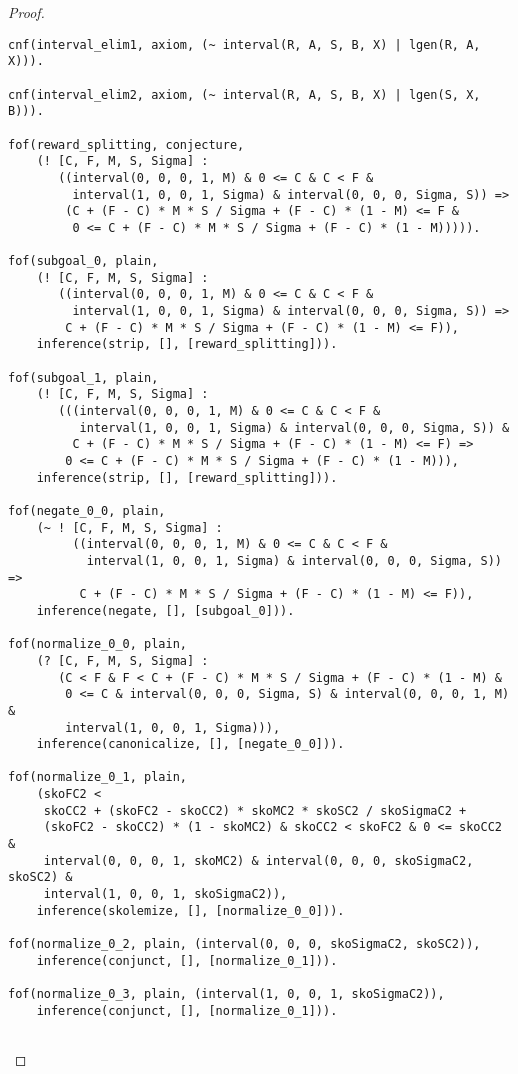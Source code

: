 \begin{proof}
\begin{verbatim}
cnf(interval_elim1, axiom, (~ interval(R, A, S, B, X) | lgen(R, A, X))).

cnf(interval_elim2, axiom, (~ interval(R, A, S, B, X) | lgen(S, X, B))).

fof(reward_splitting, conjecture,
    (! [C, F, M, S, Sigma] :
       ((interval(0, 0, 0, 1, M) & 0 <= C & C < F &
         interval(1, 0, 0, 1, Sigma) & interval(0, 0, 0, Sigma, S)) =>
        (C + (F - C) * M * S / Sigma + (F - C) * (1 - M) <= F &
         0 <= C + (F - C) * M * S / Sigma + (F - C) * (1 - M))))).

fof(subgoal_0, plain,
    (! [C, F, M, S, Sigma] :
       ((interval(0, 0, 0, 1, M) & 0 <= C & C < F &
         interval(1, 0, 0, 1, Sigma) & interval(0, 0, 0, Sigma, S)) =>
        C + (F - C) * M * S / Sigma + (F - C) * (1 - M) <= F)),
    inference(strip, [], [reward_splitting])).

fof(subgoal_1, plain,
    (! [C, F, M, S, Sigma] :
       (((interval(0, 0, 0, 1, M) & 0 <= C & C < F &
          interval(1, 0, 0, 1, Sigma) & interval(0, 0, 0, Sigma, S)) &
         C + (F - C) * M * S / Sigma + (F - C) * (1 - M) <= F) =>
        0 <= C + (F - C) * M * S / Sigma + (F - C) * (1 - M))),
    inference(strip, [], [reward_splitting])).

fof(negate_0_0, plain,
    (~ ! [C, F, M, S, Sigma] :
         ((interval(0, 0, 0, 1, M) & 0 <= C & C < F &
           interval(1, 0, 0, 1, Sigma) & interval(0, 0, 0, Sigma, S)) =>
          C + (F - C) * M * S / Sigma + (F - C) * (1 - M) <= F)),
    inference(negate, [], [subgoal_0])).

fof(normalize_0_0, plain,
    (? [C, F, M, S, Sigma] :
       (C < F & F < C + (F - C) * M * S / Sigma + (F - C) * (1 - M) &
        0 <= C & interval(0, 0, 0, Sigma, S) & interval(0, 0, 0, 1, M) &
        interval(1, 0, 0, 1, Sigma))),
    inference(canonicalize, [], [negate_0_0])).

fof(normalize_0_1, plain,
    (skoFC2 <
     skoCC2 + (skoFC2 - skoCC2) * skoMC2 * skoSC2 / skoSigmaC2 +
     (skoFC2 - skoCC2) * (1 - skoMC2) & skoCC2 < skoFC2 & 0 <= skoCC2 &
     interval(0, 0, 0, 1, skoMC2) & interval(0, 0, 0, skoSigmaC2, skoSC2) &
     interval(1, 0, 0, 1, skoSigmaC2)),
    inference(skolemize, [], [normalize_0_0])).

fof(normalize_0_2, plain, (interval(0, 0, 0, skoSigmaC2, skoSC2)),
    inference(conjunct, [], [normalize_0_1])).

fof(normalize_0_3, plain, (interval(1, 0, 0, 1, skoSigmaC2)),
    inference(conjunct, [], [normalize_0_1])).


\end{verbatim}
\end{proof}
